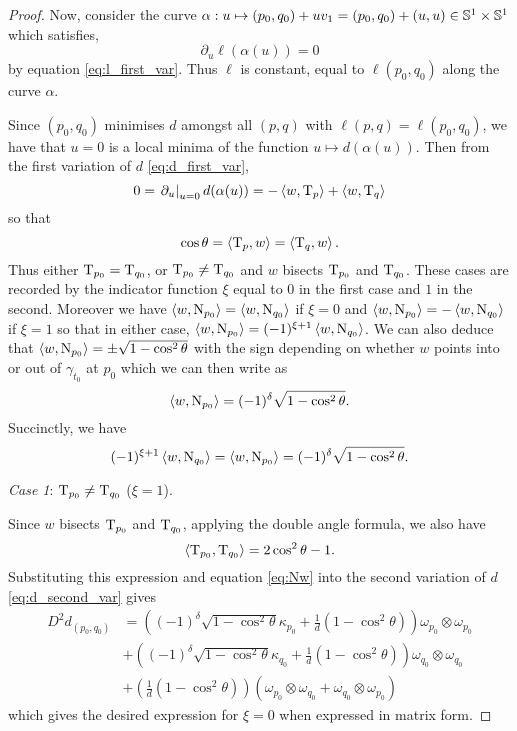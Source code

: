 \documentclass[a4paper, 12pt]{amsart}
\begin{document}
\begin{proof}
Now, consider the curve $\alpha: u \mapsto (p_0,q_0) + uv_1 = (p_0,q_0) + (u, u) \in \S^1\times \S^1$ which satisfies,
\[
\partial_u \ell(\alpha(u)) = 0 
\]
by equation \eqref{eq:l_first_var}. Thus $\ell$ is constant, equal to $\ell(p_0, q_0)$ along the curve $\alpha$. 

Since $(p_0, q_0)$ minimises $d$ amongst all $(p,q)$ with $\ell(p, q) = \ell(p_0, q_0)$, we have that $u=0$ is a local minima of the function $u\mapsto d(\alpha(u))$. Then from the first variation of $d$ \eqref{eq:d_first_var},
\[
0 = \left.\partial_u\right|_{u=0} d(\alpha(u)) = -\inpr{w}{\tang_p} + \inpr{w}{\tang_q}
\]
so that
\[
\cos\theta = \inpr{\tang_p}{w} = \inpr{\tang_q}{w}.
\]
Thus either $\tang_{p_0} = \tang_{q_0}$, or $\tang_{p_0} \ne \tang_{q_0}$ and $w$ bisects $\tang_{p_0}$ and $\tang_{q_0}$. These cases are recorded by the indicator function $\xi$ equal to \(0\) in the first case and \(1\) in the second. Moreover we have $\inpr{w}{\nor_{p_0}} = \inpr{w}{\nor_{q_0}}$ if \(\xi = 0\) and $\inpr{w}{\nor_{p_0}} = -\inpr{w}{\nor_{q_0}}$ if \(\xi=1\) so that in either case, $\inpr{w}{\nor_{p_0}} = (-1)^{\xi + 1} \inpr{w}{\nor_{q_0}}$. We can also deduce that $\inpr{w}{\nor_{p_0}} = \pm \sqrt{1-\cos^2\theta}$ with the sign depending on whether $w$ points into or out of $\gamma_{t_0}$ at $p_0$ which we can then write as
\[
\inpr{w}{\nor_{p_0}} = (-1)^\delta \sqrt{1-\cos^2\theta}.
\]
Succinctly, we have
\begin{equation}
\label{eq:Nw}
(-1)^{\xi+1} \inpr{w}{\nor_{q_0}} = \inpr{w}{\nor_{p_0}} =  (-1)^\delta \sqrt{1-\cos^2\theta}.
\end{equation}

\emph{Case 1}: $\tang_{p_0} \ne \tang_{q_0}$ ($\xi = 1$).

Since $w$ bisects $\tang_{p_0}$ and $\tang_{q_0}$, applying the double angle formula, we also have 
\[
\inpr{\tang_{p_0}}{\tang_{q_0}} = 2\cos^2\theta - 1.
\]
Substituting this expression and equation \eqref{eq:Nw} into the second variation of $d$ \eqref{eq:d_second_var} gives
\begin{align*}
D^2d_{(p_0,q_0)} &=  \left((-1)^{\delta} \sqrt{1-\cos^2\theta}\kappa_{p_0} + \frac{1}{d}(1 - \cos^2\theta) \right) \omega_{p_0} \otimes \omega_{p_0} \\
&+ \left((-1)^{\delta} \sqrt{1-\cos^2\theta} \kappa_{q_0} + \frac{1}{d}(1 - \cos^2\theta) \right) \omega_{q_0} \otimes \omega_{q_0} \\
&+ \left(\frac{1}{d}(1 - \cos^2\theta) \right) \left(\omega_{p_0} \otimes \omega_{q_0} + \omega_{q_0} \otimes \omega_{p_0} \right)
\end{align*}
which gives the desired expression for $\xi=0$ when expressed in matrix form.


\end{proof}
\end{document}
